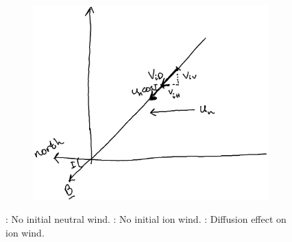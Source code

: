 \begin{figure}[t]
\begin{subfigure}[t]{.32\linewidth}
        \includegraphics[width=\linewidth]{bilder/L6_diffusion_wind.png}
        \caption{}\label{fig:L6_diffusion_wind}
    \end{subfigure}

    \caption{: No initial neutral wind. : No initial ion wind. : Diffusion effect on ion wind.}\label{fig:L6_ion_and_neutral_winds}
\end{figure}

